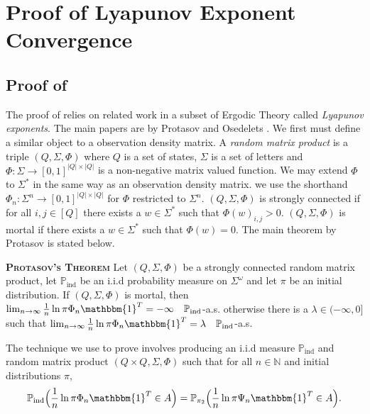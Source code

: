 \documentclass[a4paper,UKenglish,cleveref, autoref,mathscr]{lipics-v2019}
\newcommand{\NN}{\mathbb{N}}
\newcommand{\PP}{\mathbb{P}}
\newcommand{\1}{\mathbbm{1}}
\newcommand{\PPind}{\PP_{\text{ind}}}
\begin{document}
\section{Proof of Lyapunov Exponent Convergence}

\subsection{Proof of }

The proof of  relies on related work in a subset of Ergodic Theory called \emph{Lyapunov exponents}. The main papers are by Protasov \cite{prot13} and Osedelets \cite{ose68}. We first must define a similar object to a observation density matrix. A \emph{random matrix product} is a triple $(Q, \Sigma, \Phi)$ where $Q$ is a set of states, $\Sigma$ is a set of letters and $\Phi : \Sigma \rightarrow [0,1]^{|Q| \times |Q|}$ is a non-negative matrix valued function. We may extend $\Phi$ to $\Sigma^*$ in the same way as an observation density matrix. we use the shorthand $\Phi_n : \Sigma^n \rightarrow [0,1]^{|Q| \times |Q|}$ for $\Phi$ restricted to $\Sigma^n$. $(Q, \Sigma, \Phi)$ is strongly connected if for all $i,j \in [Q]$ there exists a  $w \in \Sigma^*$ such that $\Phi(w)_{i,j} > 0$. $(Q, \Sigma, \Phi)$ is mortal if there exists a $w \in \Sigma^*$ such that $\Phi(w) = 0$. The main theorem by Protasov is stated below. 

\begin{theorem}\textsc{\textbf{Protasov's Theorem}}\label{protstheorem}
Let $(Q, \Sigma, \Phi)$ be a strongly connected random matrix product, let $\PPind$ be an i.i.d probability measure on $\Sigma^\omega$ and let $\pi$ be an initial distribution. If $(Q, \Sigma, \Phi)$ is mortal, then $\lim_{n \rightarrow \infty} \frac1n \ln \pi \Phi_n \1^T = -\infty \quad \PPind$-a.s. otherwise there is a $\lambda \in (-\infty, 0]$ such that $\lim_{n \rightarrow \infty} \frac1n \ln \pi \Phi_n \1^T = \lambda \quad \PPind$-a.s.
\end{theorem}

The technique we use to prove  involves producing an i.i.d measure $\PPind$ and random matrix product $(Q \times Q, \Sigma, \Phi)$ such that for all $n \in \NN$ and initial distributions $\pi$,
\begin{equation*}
\PPind\Big( \frac1n \ln \pi \Phi_n \1^T \in A \Big) = \PP_{\pi_2}\Big( \frac1n \ln \pi \Psi_n \1^T \in A\Big).
\end{equation*}
\end{document}
